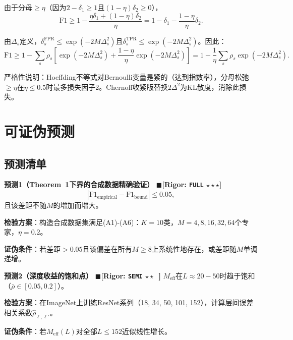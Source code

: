\documentclass[12pt,a4paper]{ctexart}
\theoremstyle{definition}
\theoremstyle{remark}
\newcommand{\rigorFull}{$\blacksquare$\;\textbf{[Rigor: \texttt{FULL} $\star\star\star$]}}
\newcommand{\rigorSemi}{$\blacksquare$\;\textbf{[Rigor: \texttt{SEMI} $\star\star\;\;$]}}
\begin{document}
由于分母$\geq \eta$（因为$2-\delta_1 \geq 1$且$(1-\eta)\delta_2 \geq 0$），
\begin{equation}
\mathrm{F1} \geq 1 - \frac{\eta\delta_1 + (1-\eta)\delta_2}{\eta} = 1 - \delta_1 - \frac{1-\eta}{\eta}\delta_2.
\end{equation}

由$\Delta_s$定义，$\delta_s^{\text{FPR}} \leq \exp(-2M\Delta_s^2)$且$\delta_s^{\text{TPR}} \leq \exp(-2M\Delta_s^2)$。因此：
\begin{equation}
\mathrm{F1} \geq 1 - \sum_s \rho_s\left[\exp(-2M\Delta_s^2) + \frac{1-\eta}{\eta}\exp(-2M\Delta_s^2)\right]
          = 1 - \frac{1}{\eta}\sum_s \rho_s \exp(-2M\Delta_s^2).
\end{equation}

严格性说明：Hoeffding不等式对Bernoulli变量是紧的（达到指数率），分母松弛$\geq \eta$在$\eta \leq 0.5$时最多损失因子2。Chernoff收紧版替换$2\Delta^2$为$\mathrm{KL}$散度，消除此损失。

\section{可证伪预测}

\subsection{预测清单}

\textbf{预测1（Theorem~1下界的合成数据精确验证）}
\rigorFull
\begin{equation}
|\mathrm{F1}_{\text{empirical}} - \mathrm{F1}_{\text{bound}}| \leq 0.05,
\end{equation}
且该差距不随$M$的增加而增大。

\textbf{检验方案}：构造合成数据集满足(A1)-(A6)：$K=10$类，$M=4,8,16,32,64$个专家，$\eta=0.2$。

\textbf{证伪条件}：若差距$>0.05$且该偏差在所有$M \geq 8$上系统性地存在，或差距随$M$单调递增。

\medskip
\textbf{预测2（深度收益的饱和点）}
\rigorSemi
$M_{\text{eff}}$在$L \approx 20-50$时趋于饱和（$\bar{\rho} \in [0.05, 0.2]$）。

\textbf{检验方案}：在ImageNet上训练ResNet系列（18, 34, 50, 101, 152），计算层间误差相关系数$\hat{\rho}_{\ell,\ell'}$。

\textbf{证伪条件}：若$M_{\text{eff}}(L)$对全部$L \leq 152$近似线性增长。
\end{document}
